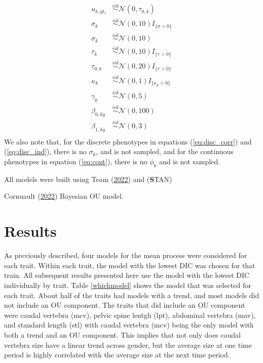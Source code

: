 \documentclass[
  12pt,
]{article}
\begin{document}
\begin{align}
u_{k,gt_1} & \overset{iid}{\sim}\mathcal{N}(0,\tau_{0,k}) \nonumber \\
\sigma_k & \overset{iid}{\sim}\mathcal{N}(0,10)I_{\{\sigma > 0\}} \nonumber \\
\sigma_k & \overset{iid}{\sim}\mathcal{N}(0,10) \nonumber \\
\tau_k & \overset{iid}{\sim}\mathcal{N}(0,10)I_{\{\tau > 0\}} \nonumber \\
\tau_{0,k} & \overset{iid}{\sim}\mathcal{N}(0,20)I_{\{\tau > 0\}} \nonumber \\
\kappa_k & \overset{iid}{\sim}\mathcal{N}(0,1)I_{\{\kappa_g > 0\}} \nonumber \\
\gamma_{k} & \overset{iid}{\sim}\mathcal{N}(0,5) \nonumber \\
\beta_{0,kg} & \overset{iid}{\sim}\mathcal{N}(0,100) \nonumber \\
\beta_{1,kg} & \overset{iid}{\sim}\mathcal{N}(0,3) \nonumber \\
\label{eq:priors}
\end{align} We also note that, for the discrete phenotypes in equations
(\ref{eq:disc_corr}) and (\ref{eq:disc_ind}), there is no \(\sigma_k\),
and is not sampled, and for the continuous phenotypes in equation
(\ref{eq:cont}), there is no \(\phi_k\) and is not sampled.

All models were built using Team
(\protect\hyperlink{ref-R2022language}{2022}) and (\textbf STAN)

Cornuault (\protect\hyperlink{ref-Cornault2022}{2022}) Bayesian OU
model.

\hypertarget{sec:results}{%
\section{Results}\label{sec:results}}

As previously described, four models for the mean process were
considered for each trait. Within each trait, the model with the lowest
DIC was chosen for that train. All subsequent results presented here use
the model with the lowest DIC individually by trait. Table
\ref{whichmodel} shows the model that was selected for each trait. About
half of the traits had models with a trend, and most models did not
include an OU component. The traits that did include an OU component
were caudal vertebra (mcv), pelvic spine lentgh (lpt), abdominal
vertebra (mav), and standard length (stl) with caudal vertebra (mcv)
being the only model with both a trend and an OU component. This implies
that not only does caudal vertebra size have a linear trend across
gender, but the average size at one time period is highly correlated
with the average size at the next time period.
\end{document}
